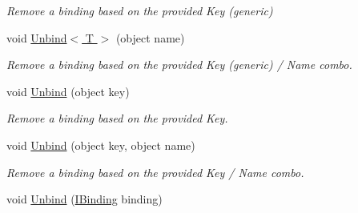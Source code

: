 \begin{DoxyCompactItemize}
\begin{DoxyCompactList}\small\item\em Remove a binding based on the provided Key (generic) \end{DoxyCompactList}\item 
\hypertarget{interfacestrange_1_1framework_1_1api_1_1_i_binder_a48d5f4abf0835c9642cf99efe8743e40}{void \hyperlink{interfacestrange_1_1framework_1_1api_1_1_i_binder_a48d5f4abf0835c9642cf99efe8743e40}{Unbind$<$ T $>$} (object name)}\label{interfacestrange_1_1framework_1_1api_1_1_i_binder_a48d5f4abf0835c9642cf99efe8743e40}

\begin{DoxyCompactList}\small\item\em Remove a binding based on the provided Key (generic) / Name combo. \end{DoxyCompactList}\item 
\hypertarget{interfacestrange_1_1framework_1_1api_1_1_i_binder_a8d35eb191d9980b0ee42379f86465ec8}{void \hyperlink{interfacestrange_1_1framework_1_1api_1_1_i_binder_a8d35eb191d9980b0ee42379f86465ec8}{Unbind} (object key)}\label{interfacestrange_1_1framework_1_1api_1_1_i_binder_a8d35eb191d9980b0ee42379f86465ec8}

\begin{DoxyCompactList}\small\item\em Remove a binding based on the provided Key. \end{DoxyCompactList}\item 
\hypertarget{interfacestrange_1_1framework_1_1api_1_1_i_binder_a18a41d2d3b07391e0ffa928a0fa5f92f}{void \hyperlink{interfacestrange_1_1framework_1_1api_1_1_i_binder_a18a41d2d3b07391e0ffa928a0fa5f92f}{Unbind} (object key, object name)}\label{interfacestrange_1_1framework_1_1api_1_1_i_binder_a18a41d2d3b07391e0ffa928a0fa5f92f}

\begin{DoxyCompactList}\small\item\em Remove a binding based on the provided Key / Name combo. \end{DoxyCompactList}\item 
\hypertarget{interfacestrange_1_1framework_1_1api_1_1_i_binder_a0abb09def546f2903c0cb37c45a616e7}{void \hyperlink{interfacestrange_1_1framework_1_1api_1_1_i_binder_a0abb09def546f2903c0cb37c45a616e7}{Unbind} (\hyperlink{interfacestrange_1_1framework_1_1api_1_1_i_binding}{I\-Binding} binding)}\label{interfacestrange_1_1framework_1_1api_1_1_i_binder_a0abb09def546f2903c0cb37c45a616e7}


\end{DoxyCompactItemize}
